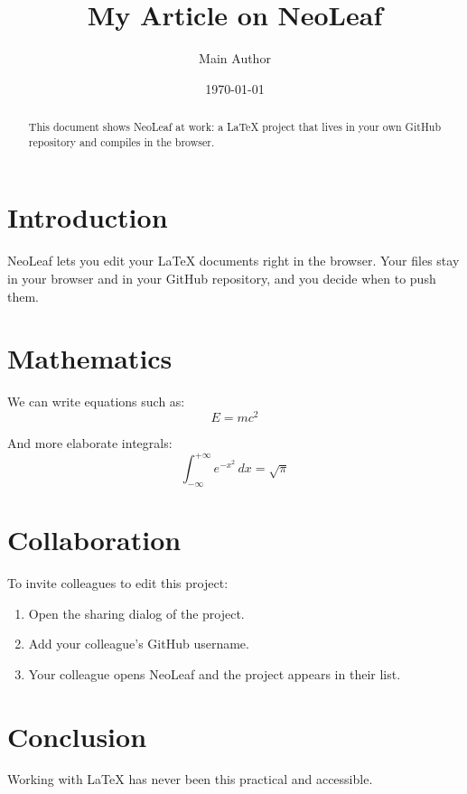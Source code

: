 \documentclass{article}
\title{My Article on NeoLeaf}
\author{Main Author}
\date{\today}
\begin{document}
\maketitle

\begin{abstract}
This document shows NeoLeaf at work: a LaTeX project that lives in your own GitHub repository and compiles in the browser.
\end{abstract}

\section{Introduction}
NeoLeaf lets you edit your LaTeX documents right in the browser. Your files stay in your browser and in your GitHub repository, and you decide when to push them.

\section{Mathematics}
We can write equations such as:
\begin{equation}
    E = mc^2
\end{equation}

And more elaborate integrals:
\begin{equation}
    \int_{-\infty}^{+\infty} e^{-x^2} \, dx = \sqrt{\pi}
\end{equation}

\section{Collaboration}
To invite colleagues to edit this project:
\begin{enumerate}
    \item Open the sharing dialog of the project.
    \item Add your colleague's GitHub username.
    \item Your colleague opens NeoLeaf and the project appears in their list.
\end{enumerate}

\section{Conclusion}
Working with LaTeX has never been this practical and accessible.
\end{document}
